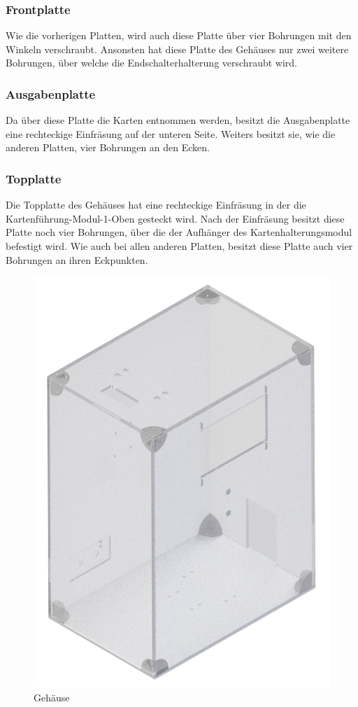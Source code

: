 \subsubsection{Frontplatte}
Wie die vorherigen Platten, wird auch diese Platte über vier Bohrungen mit den Winkeln verschraubt.
Ansonsten hat diese Platte des Gehäuses nur zwei weitere Bohrungen, über welche die Endschalterhalterung verschraubt wird.

\subsubsection{Ausgabenplatte}
Da über diese Platte die Karten entnommen werden, besitzt die Ausgabenplatte eine rechteckige Einfräsung auf der unteren
Seite.
Weiters besitzt sie, wie die anderen Platten, vier Bohrungen an den Ecken.

\subsubsection{Topplatte}
Die Topplatte des Gehäuses hat eine rechteckige Einfräsung in der die Kartenführung-Modul-1-Oben
gesteckt wird.
Nach der Einfräsung besitzt diese Platte noch vier Bohrungen, über die der Aufhänger des Kartenhalterungsmodul
befestigt wird.
Wie auch bei allen anderen Platten, besitzt diese Platte auch vier Bohrungen an ihren Eckpunkten.

\begin{figure}[H]
    \centering
    \includegraphics[scale=0.2,page=1]{fig/mech/Gehauuse.png}
    \caption{Gehäuse}
\end{figure}

